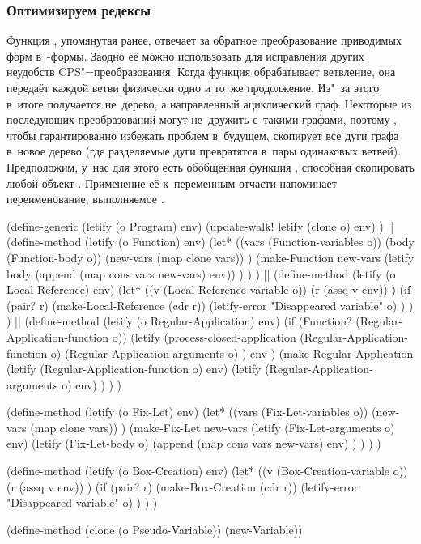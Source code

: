

\subsubsection{Оптимизируем редексы}\label{cc/call/cc/cc/ssect:letify}

Функция , упомянутая ранее, отвечает за обратное преобразование
приводимых форм в~-формы. Заодно её можно использовать для исправления
других неудобств CPS"=преобразования. Когда функция  обрабатывает
ветвление, она передаёт каждой ветви физически одно и то~же продолжение. Из"~за
этого в~итоге получается не~дерево, а направленный ациклический граф. Некоторые
из последующих преобразований могут не~дружить с~такими графами, поэтому
, чтобы гарантированно избежать проблем в~будущем, скопирует все дуги
графа в~новое дерево (где разделяемые дуги превратятся в~пары одинаковых
ветвей). Предположим, у~нас для этого есть обобщённая функция ,
способная скопировать любой объект {\Meroonet}. 
Применение её к~переменным отчасти напоминает переименование, выполняемое
.

\begin{code:lisp}
(define-generic (letify (o Program) env)
  (update-walk! letify (clone o) env) )
||
(define-method (letify (o Function) env)
  (let* ((vars (Function-variables o))
         (body (Function-body o))
         (new-vars (map clone vars)) )
    (make-Function
     new-vars
     (letify body (append (map cons vars new-vars) env)) ) ) )
||
(define-method (letify (o Local-Reference) env)
  (let* ((v (Local-Reference-variable o))
         (r (assq v env)) )
    (if (pair? r)
        (make-Local-Reference (cdr r))
        (letify-error "Disappeared variable" o) ) ) )
||
(define-method (letify (o Regular-Application) env)
  (if (Function? (Regular-Application-function o))
      (letify (process-closed-application
               (Regular-Application-function o)
               (Regular-Application-arguments o) )
              env )
      (make-Regular-Application
       (letify (Regular-Application-function o) env)
       (letify (Regular-Application-arguments o) env) ) ) )

(define-method (letify (o Fix-Let) env)
  (let* ((vars (Fix-Let-variables o))
         (new-vars (map clone vars)) )
    (make-Fix-Let
     new-vars
     (letify (Fix-Let-arguments o) env)
     (letify (Fix-Let-body o)
             (append (map cons vars new-vars) env) ) ) ) )

(define-method (letify (o Box-Creation) env)
  (let* ((v (Box-Creation-variable o))
         (r (assq v env)) )
    (if (pair? r)
        (make-Box-Creation (cdr r))
        (letify-error "Disappeared variable" o) ) ) )

(define-method (clone (o Pseudo-Variable)) (new-Variable))
\end{code:lisp}


